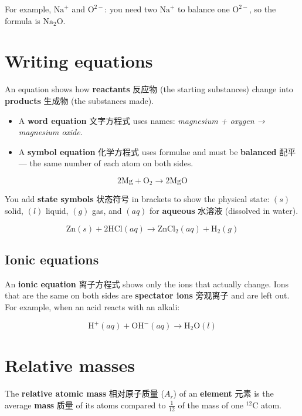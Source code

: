 \documentclass[11pt]{article}
\begin{document}
For example, $\text{Na}^{+}$ and $\text{O}^{2-}$: you need two $\text{Na}^{+}$ to balance one $\text{O}^{2-}$, so the formula is $\text{Na}_2\text{O}$.

\section*{Writing equations}

An equation shows how \textbf{reactants} 反应物 (the starting substances) change into \textbf{products} 生成物 (the substances made).

\begin{itemize}
\item A \textbf{word equation} 文字方程式 uses names: \emph{magnesium + oxygen → magnesium oxide}.

\item A \textbf{symbol equation} 化学方程式 uses formulae and must be \textbf{balanced} 配平 — the same number of each atom on both sides.

\end{itemize}

\[
2\text{Mg} + \text{O}_2 \rightarrow 2\text{MgO}
\]

You add \textbf{state symbols} 状态符号 in brackets to show the physical state: $(s)$ solid, $(l)$ liquid, $(g)$ gas, and $(aq)$ for \textbf{aqueous} 水溶液 (dissolved in water).

\[
\text{Zn}(s) + 2\text{HCl}(aq) \rightarrow \text{ZnCl}_2(aq) + \text{H}_2(g)
\]

\subsection*{Ionic equations}

An \textbf{ionic equation} 离子方程式 shows only the ions that actually change. Ions that are the same on both sides are \textbf{spectator ions} 旁观离子 and are left out. For example, when an acid reacts with an alkali:

\[
\text{H}^{+}(aq) + \text{OH}^{-}(aq) \rightarrow \text{H}_2\text{O}(l)
\]

\section*{Relative masses}

The \textbf{relative atomic mass} 相对原子质量 ($A_r$) of an \textbf{element} 元素 is the average \textbf{mass} 质量 of its atoms compared to $\tfrac{1}{12}$ of the mass of one $^{12}\text{C}$ atom.
\end{document}

